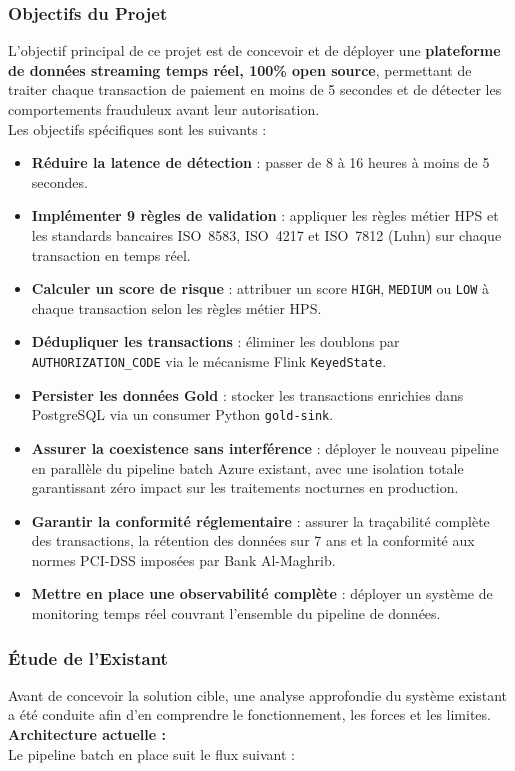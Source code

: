 \newpage
\subsubsection{Objectifs du Projet}
\vspace{0.3cm}
L'objectif principal de ce projet est de concevoir et de déployer une \textbf{plateforme de données streaming temps réel, 100\% open source}, permettant de traiter chaque transaction de paiement en moins de 5 secondes et de détecter les comportements frauduleux avant leur autorisation.
\\[0.3cm]
Les objectifs spécifiques sont les suivants :

\begin{itemize}
    \item \textbf{Réduire la latence de détection} : passer de 8 à 16 heures à moins de 5 secondes.
    \item \textbf{Implémenter 9 règles de validation} : appliquer les règles métier HPS et les standards bancaires ISO~8583, ISO~4217 et ISO~7812 (Luhn) sur chaque transaction en temps réel.
    \item \textbf{Calculer un score de risque} : attribuer un score \texttt{HIGH}, \texttt{MEDIUM} ou \texttt{LOW} à chaque transaction selon les règles métier HPS.
    \item \textbf{Dédupliquer les transactions} : éliminer les doublons par \texttt{AUTHORIZATION\_CODE} via le mécanisme Flink \texttt{KeyedState}.
    \item \textbf{Persister les données Gold} : stocker les transactions enrichies dans PostgreSQL via un consumer Python \texttt{gold-sink}.
    \item \textbf{Assurer la coexistence sans interférence} : déployer le nouveau pipeline en parallèle du pipeline batch Azure existant, avec une isolation totale garantissant zéro impact sur les traitements nocturnes en production.
    \item \textbf{Garantir la conformité réglementaire} : assurer la traçabilité complète des transactions, la rétention des données sur 7 ans et la conformité aux normes PCI-DSS imposées par Bank Al-Maghrib.
    \item \textbf{Mettre en place une observabilité complète} : déployer un système de monitoring temps réel couvrant l'ensemble du pipeline de données.
\end{itemize}

\subsubsection{Étude de l'Existant}
\vspace{0.3cm}
Avant de concevoir la solution cible, une analyse approfondie du système existant a été conduite afin d'en comprendre le fonctionnement, les forces et les limites.
\\[0.3cm]
\textbf{Architecture actuelle :}\\
Le pipeline batch en place suit le flux suivant :

